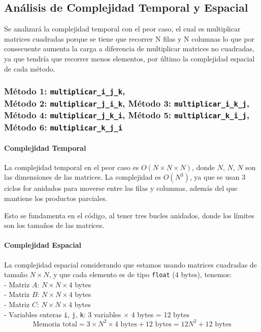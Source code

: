 \documentclass[10pt]{article}
\begin{document}
\subsection{Análisis de Complejidad Temporal y Espacial}

Se analizará la complejidad temporal con el peor caso, el cual es multiplicar matrices cuadradas porque se tiene que recorrer N filas y N columnas lo que por consecuente aumenta la carga a diferencia de multiplicar matrices no cuadradas, ya que tendría que recorrer menos elementos, por último la complejidad espacial de cada método.

\subsubsection{Método 1: \texttt{multiplicar\_i\_j\_k},\\
Método 2: \texttt{multiplicar\_j\_i\_k},
Método 3: \texttt{multiplicar\_i\_k\_j},\\
Método 4: \texttt{multiplicar\_j\_k\_i},
Método 5: \texttt{multiplicar\_k\_i\_j},\\
Método 6: \texttt{multiplicar\_k\_j\_i}
}

\paragraph{Complejidad Temporal}

La complejidad temporal en el peor caso es $O(N \times N \times N)$, donde $N$, $N$, $N$ son las dimensiones de las matrices. La complejidad es $O(N^3)$, ya que se usan 3 ciclos for anidados para moverse entre las filas y columnas, además del que mantiene los productos parciales.

Esto se fundamenta en el código, al tener tres bucles anidados, donde los límites son los tamaños de las matrices.

\paragraph{Complejidad Espacial}

La complejidad espacial considerando que estamos usando matrices cuadradas de tamaño $N \times N$, y que cada elemento es de tipo \texttt{float} (4 bytes), tenemos:\\

- Matriz $A$: $N \times N \times 4$ bytes\\
- Matriz $B$: $N \times N \times 4$ bytes\\
- Matriz $C$: $N \times N \times 4$ bytes\\
- Variables enteras \texttt{i}, \texttt{j}, \texttt{k}: 3 variables $\times$ 4 bytes = 12 bytes\\
\[
\text{Memoria total} = 3 \times N^2 \times 4 \text{ bytes} + 12 \text{ bytes} = 12N^2 + 12 \text{ bytes}
\]
\end{document}
